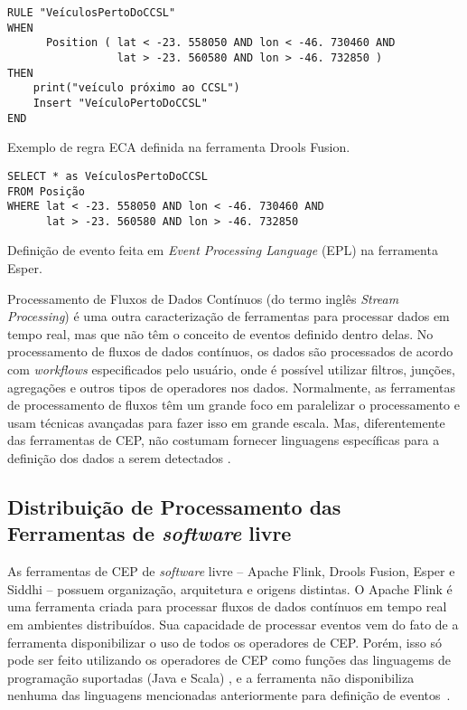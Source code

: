 \begin{evento}[t]
\begin{verbatim}
RULE "VeículosPertoDoCCSL"
WHEN 
      Position ( lat < -23. 558050 AND lon < -46. 730460 AND
                 lat > -23. 560580 AND lon > -46. 732850 )
THEN
    print("veículo próximo ao CCSL")
    Insert "VeículoPertoDoCCSL"
END                
\end{verbatim}
\caption{Exemplo de regra ECA definida na ferramenta Drools Fusion. }
\label{ECAruleexample}
\end{evento}

\begin{evento}[b]
\begin{verbatim}
SELECT * as VeículosPertoDoCCSL
FROM Posição
WHERE lat < -23. 558050 AND lon < -46. 730460 AND
      lat > -23. 560580 AND lon > -46. 732850
\end{verbatim}
\caption{Definição de evento feita em \textit{Event Processing Language} (EPL) na ferramenta Esper.}
\label{EPLexample}
\end{evento}

Processamento de Fluxos de Dados Contínuos (do termo inglês \textit{Stream Processing}) é uma outra caracterização de ferramentas para processar dados em tempo real, mas que não têm o conceito de eventos definido dentro delas. No processamento de fluxos de dados contínuos, os dados são processados de acordo com \textit{workflows} especificados pelo usuário, onde é possível utilizar filtros, junções, agregações e outros tipos de operadores nos dados. Normalmente, as ferramentas de processamento de fluxos têm um grande foco em  paralelizar o processamento e usam técnicas avançadas para fazer isso em grande escala. Mas, diferentemente das ferramentas de CEP, não costumam fornecer linguagens específicas para a definição dos dados a serem detectados \citep{Margara:2011:PFI:2002259.2002307}.

\subsection{Distribuição de Processamento das Ferramentas de \textit{software} livre}
\label{sub-sec:opensourcetoolsdistribution}

As ferramentas de CEP de \textit{software} livre -- Apache Flink, Drools Fusion, Esper e Siddhi -- possuem organização, arquitetura e origens distintas. O Apache Flink é uma ferramenta criada para processar fluxos de dados contínuos em tempo real em ambientes distribuídos. Sua capacidade de processar eventos vem do fato de a ferramenta disponibilizar o uso de todos os operadores de CEP. Porém, isso só pode ser feito utilizando os operadores de CEP como funções das linguagems de programação suportadas (Java e Scala)%
, e a ferramenta não disponibiliza nenhuma das linguagens mencionadas anteriormente para definição de eventos~\citep{FlinkCEP}.


